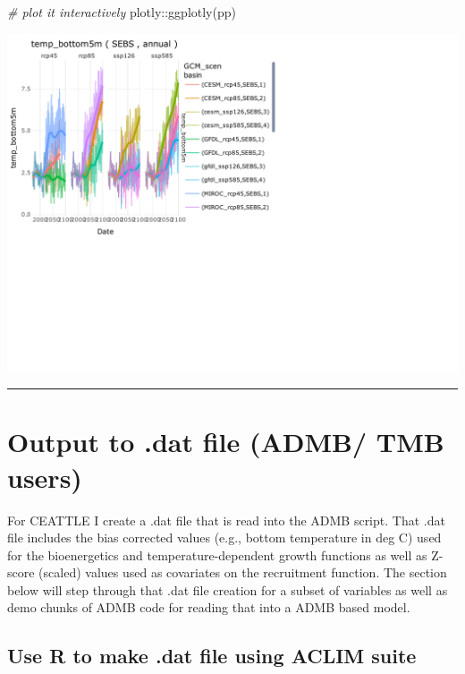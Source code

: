 \documentclass[
]{article}
\newenvironment{Shaded}{\begin{snugshade}}{\end{snugshade}}
\newcommand{\CommentTok}[1]{\textcolor[rgb]{0.56,0.35,0.01}{\textit{#1}}}
\newcommand{\FunctionTok}[1]{\textcolor[rgb]{0.00,0.00,0.00}{#1}}
\newcommand{\NormalTok}[1]{#1}
\newcommand{\SpecialCharTok}[1]{\textcolor[rgb]{0.00,0.00,0.00}{#1}}
\begin{document}
\begin{Shaded}
\begin{Highlighting}[]
  \CommentTok{\# plot it interactively}
\NormalTok{  plotly}\SpecialCharTok{::}\FunctionTok{ggplotly}\NormalTok{(pp)}
\end{Highlighting}
\end{Shaded}

\begin{center}\includegraphics{ACLIM2_quickStart_files/figure-latex/unnamed-chunk-8-1} \end{center}

\begin{center}\rule{0.5\linewidth}{0.5pt}\end{center}

\hypertarget{output-to-.dat-file-admb-tmb-users}{%
\section{Output to .dat file (ADMB/ TMB
users)}\label{output-to-.dat-file-admb-tmb-users}}

For CEATTLE I create a .dat file that is read into the ADMB script. That
.dat file includes the bias corrected values (e.g., bottom temperature
in deg C) used for the bioenergetics and temperature-dependent growth
functions as well as Z-score (scaled) values used as covariates on the
recruitment function. The section below will step through that .dat file
creation for a subset of variables as well as demo chunks of ADMB code
for reading that into a ADMB based model.

\hypertarget{use-r-to-make-.dat-file-using-aclim-suite}{%
\subsection{Use R to make .dat file using ACLIM
suite}\label{use-r-to-make-.dat-file-using-aclim-suite}}
\end{document}
